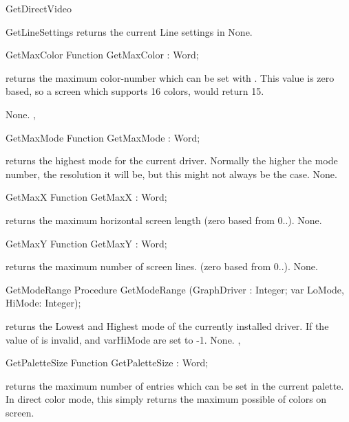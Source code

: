 \begin{function}{GetDirectVideo}
\begin{procedure}{GetLineSettings}
\Description
{} returns the current Line settings in
\Errors
None.
\SeeAlso
{}
\end{procedure}
\begin{function}{GetMaxColor}
\Declaration
Function GetMaxColor  : Word;

\Description
{} returns the maximum color-number which can
be set with . This value is zero based, so a screen
which supports 16 colors, would return 15.

\Errors
None.
\SeeAlso
{},
\end{function}
\begin{function}{GetMaxMode}
\Declaration
Function GetMaxMode  : Word;

\Description
{} returns the highest mode for the current driver. Normally
the higher the mode number, the resolution it will be, but this might not
always be the case.
\Errors
None.
\SeeAlso
{}
\end{function}

\begin{function}{GetMaxX}
\Declaration
Function GetMaxX  : Word;

\Description
{} returns the maximum horizontal screen
length (zero based from 0..).
\Errors
None.
\SeeAlso
{}
\end{function}
\begin{function}{GetMaxY}
\Declaration
Function GetMaxY  : Word;

\Description
{} returns the maximum number of screen
lines. (zero based from 0..).
\Errors
None.
\SeeAlso
{}
\end{function}

\begin{procedure}{GetModeRange}
\Declaration
Procedure GetModeRange (GraphDriver : Integer; var LoMode, HiMode: Integer);

\Description
{} returns the Lowest and Highest mode of the currently
installed driver. If the value of  is invalid, 
and var{HiMode} are set to -1.
\Errors
None.
\SeeAlso
{}, 
\end{procedure}
\begin{function}{GetPaletteSize}
\Declaration
Function GetPaletteSize  : Word;

\Description
{} returns the maximum number of entries which
can be set in the current palette. In direct color mode, this simply
returns the maximum possible of colors on screen.


\end{function}
\end{function}
